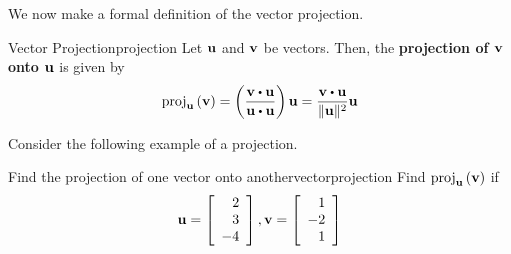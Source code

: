 We now make a formal definition of the vector projection.

\begin{definition}{Vector Projection}{projection}
Let ${\bf u}$ and ${\bf v}$ be vectors. Then, the \textbf{projection of ${\bf v}$ onto
${\bf u}$} is given by 
\begin{equation*}
\func{proj}_{\vect{u}}\left( \vect{v}\right) =\left( \vspace{0.05in}
\frac{\vect{v}\dotprod \vect{u}}{\vect{u}\dotprod \vect{u}}\right) \vect{u}
=
\frac{\vect{v}\dotprod \vect{u}}{\vectlength \vect{u}\vectlength ^{2}}\vect{u}
\end{equation*}
\end{definition}

Consider the following example of a projection.

\begin{example}{Find the projection of one vector onto another}{vectorprojection}
Find 
$\mbox{proj}_{{\bf u}}\left( {\bf v}\right) $ if 
\begin{equation*}
{\bf u}=
\left[
\begin{array}{r}
2 \\
3 \\
-4
\end{array}
\right],
{\bf v}=
\left[
\begin{array}{r}
1 \\
-2 \\
1
\end{array}
\right]
\end{equation*}
\end{example}

